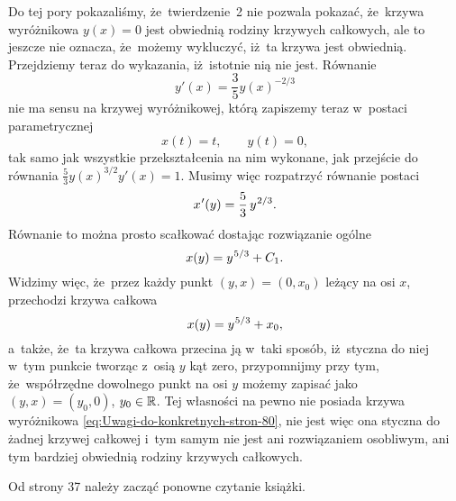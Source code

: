 \documentclass[a4paper,11pt]{article}
\numberwithin{equation}{section}
\begin{document}
Do tej pory pokazaliśmy, że~twierdzenie~2 nie pozwala pokazać, że~krzywa
wyróżnikowa $y( x ) = 0$ jest obwiednią rodziny krzywych całkowych, ale to
jeszcze nie oznacza, że~możemy wykluczyć, iż~ta krzywa jest obwiednią.
Przejdziemy teraz do wykazania, iż~istotnie nią nie jest. Równanie
\begin{equation}
  \label{eq:Uwagi-do-konkretnych-stron-79}
  y'( x ) = \frac{ 3 }{ 5 } y( x )^{ -2/3 }
\end{equation}
nie ma sensu na krzywej wyróżnikowej, którą zapiszemy teraz w~postaci
parametrycznej
\begin{equation}
  \label{eq:Uwagi-do-konkretnych-stron-80}
  x( t ) = t, \qquad
  y( t ) = 0,
\end{equation}
tak samo jak wszystkie przekształcenia na nim wykonane, jak przejście do
równania $\frac{ 5 }{ 3 } y( x )^{ 3/2 } y'( x ) = 1$. Musimy więc
rozpatrzyć równanie postaci
\begin{equation}
  \label{eq:Uwagi-do-konkretnych-stron-81}
  x \hspace{0.05em} '( y ) =
  \frac{ 5 }{ 3 } \, y^{ \hspace{0.05em} 2/3 }.
\end{equation}
Równanie to można prosto scałkować dostając rozwiązanie ogólne
\begin{equation}
  \label{eq:Uwagi-do-konkretnych-stron-82}
  x( y ) = y^{ \hspace{0.05em} 5/3 } + C_{ 1 }.
\end{equation}
Widzimy więc, że~przez każdy punkt $( y, x ) = ( 0, x_{ 0 } )$ leżący na
osi $x$, przechodzi krzywa całkowa
\begin{equation}
  \label{eq:Uwagi-do-konkretnych-stron-83}
  x( y ) = y^{ \hspace{0.05em} 5/3 } + x_{ 0 },
\end{equation}
a~także, że~ta krzywa całkowa przecina ją w~taki sposób, iż~styczna
do niej w~tym punkcie tworząc z~osią $y$ kąt zero, przypomnijmy przy tym,
że~współrzędne dowolnego punkt na osi $y$ możemy zapisać
jako $( y, x ) = ( y_{ 0 }, 0 )$, $y_{ 0 } \in \mathbb{R}$. Tej własności na pewno
nie posiada krzywa wyróżnikowa \eqref{eq:Uwagi-do-konkretnych-stron-80},
nie jest więc ona styczna do żadnej krzywej całkowej i~tym samym nie
jest ani rozwiązaniem osobliwym, ani tym bardziej obwiednią rodziny krzywych
całkowych.

{\Large Od strony 37 należy zacząć ponowne czytanie książki.}
\end{document}
